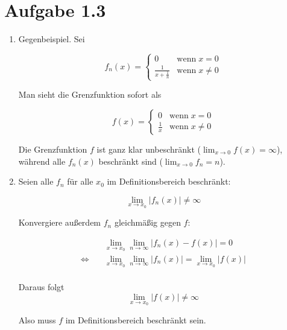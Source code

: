 \documentclass[a4paper,german,12pt,smallheadings]{scrartcl}
\begin{document}
\section*{Aufgabe 1.3}
\begin{enumerate}[(1)]
\item Gegenbeispiel. Sei

\begin{equation*}
  f_n(x) = \begin{cases} 
    0           & \mbox{wenn} \; x = 0 \\
    \frac{1}{x + \frac{1}{n}} & \mbox{wenn} \; x \neq 0
  \end{cases}
\end{equation*}


Man sieht die Grenzfunktion sofort als

\begin{equation*}
  f(x) = \begin{cases} 
    0           & \mbox{wenn} \; x = 0 \\
    \frac{1}{x} & \mbox{wenn} \; x \neq 0
  \end{cases}
\end{equation*}

Die Grenzfunktion $f$ ist ganz klar unbeschränkt ($\lim_{x \to 0} f(x) = \infty$), während alle $f_n(x)$ beschränkt sind ($\lim_{x \to 0} f_n = n$).

\item
  Seien alle $f_n$ für alle $x_0$ im Definitionsbereich beschränkt:

  \begin{equation*}
    \lim_{x \to x_0} |f_n(x)| \neq \infty
  \end{equation*}

  Konvergiere außerdem $f_n$ gleichmäßig gegen $f$:

  \begin{align*}
    &\quad \lim_{x \to x_0} \lim_{n \to \infty} |f_n(x) - f(x)| = 0 \\
    \Leftrightarrow&\quad \lim_{x \to x_0} \lim_{n \to \infty} |f_n(x)| = \lim_{x \to x_0} |f(x)| \\
  \end{align*}

  Daraus folgt
  \begin{equation*}
    \lim_{x \to x_0} |f(x)| \neq \infty
  \end{equation*}

  Also muss $f$ im Definitionsbereich beschränkt sein.
\end{enumerate}
\end{document}
